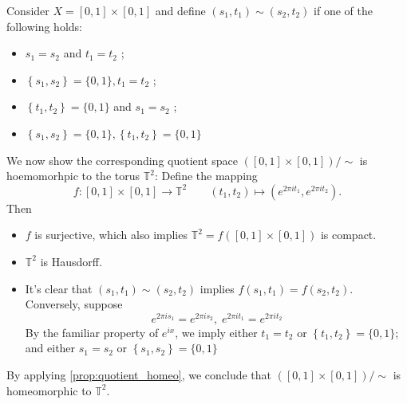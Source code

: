 \begin{example}
Consider \(X = \left\lbrack  {0,1}\right\rbrack   \times  \left\lbrack  {0,1}\right\rbrack\) and define \(\left( {{s}_{1},{t}_{1}}\right)  \sim  \left( {{s}_{2},{t}_{2}}\right)\) if one of the following holds:
\begin{itemize}
\item \({s}_{1} = {s}_{2}\) and \({t}_{1} = {t}_{2}\) ;
\item \(\left\{  {{s}_{1},{s}_{2}}\right\}   = \{ 0,1\},{t}_{1} = {t}_{2}\) ;
\item \(\left\{  {{t}_{1},{t}_{2}}\right\}   = \{ 0,1\}\) and \({s}_{1} = {s}_{2}\) ;
\item \(\left\{  {{s}_{1},{s}_{2}}\right\}   = \{ 0,1\},\left\{  {{t}_{1},{t}_{2}}\right\}   = \{ 0,1\}\)
\end{itemize}
We now show the corresponding quotient space \(\left( {\left\lbrack  {0,1}\right\rbrack   \times  \left\lbrack  {0,1}\right\rbrack  }\right) / \sim\) is hoemomorhpic to the torus \({\mathbb{T}}^{2}\): Define the mapping 
\[f: \left\lbrack  {0,1}\right\rbrack   \times  \left\lbrack  {0,1}\right\rbrack   \rightarrow  {\mathbb{T}}^{2} \quad \quad \left( {{t}_{1},{t}_{2}}\right)  \mapsto  \left( {{e}^{{2\pi i}{t}_{1}},{e}^{{2\pi i}{t}_{2}}}\right).\]
Then
\begin{itemize}
    \item \(f\) is surjective, which also implies \({\mathbb{T}}^{2} = f\left( {\left\lbrack  {0,1}\right\rbrack   \times  \left\lbrack  {0,1}\right\rbrack  }\right)\) is compact.

 \item \({\mathbb{T}}^{2}\) is Hausdorff.

\item It’s clear that \(\left( {{s}_{1},{t}_{1}}\right)  \sim  \left( {{s}_{2},{t}_{2}}\right)\) implies \(f\left( {{s}_{1},{t}_{1}}\right)  = f\left( {{s}_{2},{t}_{2}}\right)\). Conversely, suppose
\[
{e}^{{2\pi i}{s}_{1}} = {e}^{{2\pi i}{s}_{2}},\;{e}^{{2\pi i}{t}_{1}} = {e}^{{2\pi i}{t}_{2}}
\]
By the familiar property of \({e}^{ix}\), we imply either \({t}_{1} = {t}_{2}\) or \(\left\{  {{t}_{1},{t}_{2}}\right\}   = \{ 0,1\}\); and either \({s}_{1} = {s}_{2}\) or \(\left\{  {{s}_{1},{s}_{2}}\right\}   = \{ 0,1\}\)
\end{itemize}
By applying \autoref{prop:quotient_homeo}, we conclude that \(\left( {\left\lbrack  {0,1}\right\rbrack   \times  \left\lbrack  {0,1}\right\rbrack  }\right) / \sim\) is homeomorphic to \({\mathbb{T}}^{2}\).
\end{example}

